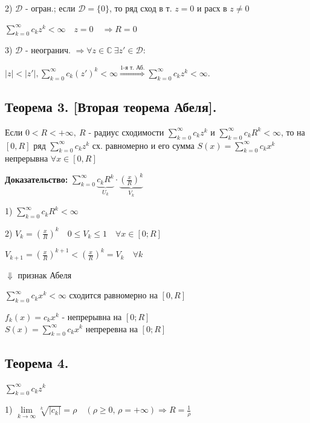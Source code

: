 \documentclass[a4paper,12pt]{article} %
\begin{document}
 2) $\mathscr{D}$ - огран.;  если $\mathscr{D} = \{0\}$, то ряд сход в т. $z = 0$ и расх в $z \neq 0$

 $ \sum\limits_{k = 0}^\infty c_k z^k < \infty \quad z = 0 \quad \Rightarrow R = 0$

 3) $\mathscr{D}$ - неогранич. $\Rightarrow \forall z \in \mathbb{C} \  \exists z'  \in \mathscr{D}:$

 $|z| < |z'|,  \sum\limits_{k = 0}^\infty c_k (z')^k < \infty \stackrel{\text{1-я т. Аб.}}{\Rightarrow}  \sum\limits_{k = 0}^\infty c_k z^k < \infty$.\\
 
 \subsection{Теорема 3. [Вторая теорема Абеля].}
 
 Если $0<R<+\infty, \  R$ - радиус сходимости $\sum\limits_{k = 0}^\infty c_k z^k$  и $\sum\limits_{k = 0}^\infty c_k R^k < \infty$, то на $[0, R]$ ряд $\sum\limits_{k = 0}^\infty c_k z^k$ сх. равномерно и его сумма $S(x) = \sum\limits_{k = 0}^\infty c_k x^k$ непрерывна $\forall x \in [0, R]$

\textbf{Доказательство:}
$ \sum\limits_{k = 0}^\infty \underbrace{c_k R^k}_{U_k} \cdot \underbrace{\left(\frac{x}{R}\right)^k}_{V_k}$

1) $\sum\limits_{k = 0}^\infty c_k R^k < \infty $

2) $V_k =  \left( \frac{x}{R} \right)^k \quad 0 \leqslant V_k \leqslant 1 \quad \forall x \in [0; R]$

  $V_{k + 1} = \left( \frac{x}{R} \right)^{k + 1}  < \left( \frac{x}{R} \right)^k = V_k \quad \forall k$
  
\hspace*{3 cm}$\Downarrow$ признак Абеля

$\sum\limits_{k = 0}^\infty c_k x^k < \infty$ сходится равномерно на $[0, R]$

$f_k(x) = c_k x^k$  - непрерывна на $[0; R]$\\

$S(x) = \sum\limits_{k = 0}^\infty c_k x^k$ непреревна на $[0; R]$

 \subsection{Теорема 4.}
 $\sum\limits_{k = 0}^\infty c_k z^k$ 
 
 1) $\lim\limits_{k \to \infty} \sqrt[k]{|c_k|} = \rho \quad (\rho \geqslant 0,\, \rho = +\infty) \Rightarrow R =  \frac{1}{\rho}$
\end{document}
